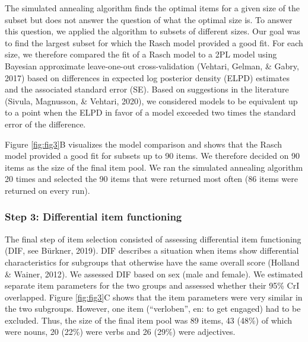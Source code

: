 \documentclass[
  man,floatsintext]{apa6}
\begin{document}
The simulated annealing algorithm finds the optimal items for a given size of the subset but does not answer the question of what the optimal size is. To answer this question, we applied the algorithm to subsets of different sizes. Our goal was to find the largest subset for which the Rasch model provided a good fit. For each size, we therefore compared the fit of a Rasch model to a 2PL model using Bayesian approximate leave-one-out cross-validation (Vehtari, Gelman, \& Gabry, 2017) based on differences in expected log posterior density (ELPD) estimates and the associated standard error (SE). Based on suggestions in the literature (Sivula, Magnusson, \& Vehtari, 2020), we considered models to be equivalent up to a point when the ELPD in favor of a model exceeded two times the standard error of the difference.

Figure \ref{fig:fig3}B visualizes the model comparison and shows that the Rasch model provided a good fit for subsets up to 90 items. We therefore decided on 90 items as the size of the final item pool. We ran the simulated annealing algorithm 20 times and selected the 90 items that were returned most often (86 items were returned on every run).

\hypertarget{step-3-differential-item-functioning}{%
\subsubsection{Step 3: Differential item functioning}\label{step-3-differential-item-functioning}}

The final step of item selection consisted of assessing differential item functioning (DIF, see Bürkner, 2019). DIF describes a situation when items show differential characteristics for subgroups that otherwise have the same overall score (Holland \& Wainer, 2012). We assessed DIF based on sex (male and female). We estimated separate item parameters for the two groups and assessed whether their 95\% CrI overlapped. Figure \ref{fig:fig3}C shows that the item parameters were very similar in the two subgroups. However, one item (``verloben'', en: to get engaged) had to be excluded. Thus, the size of the final item pool was 89 items, 43 (48\%) of which were nouns, 20 (22\%) were verbs and 26 (29\%) were adjectives.
\end{document}

